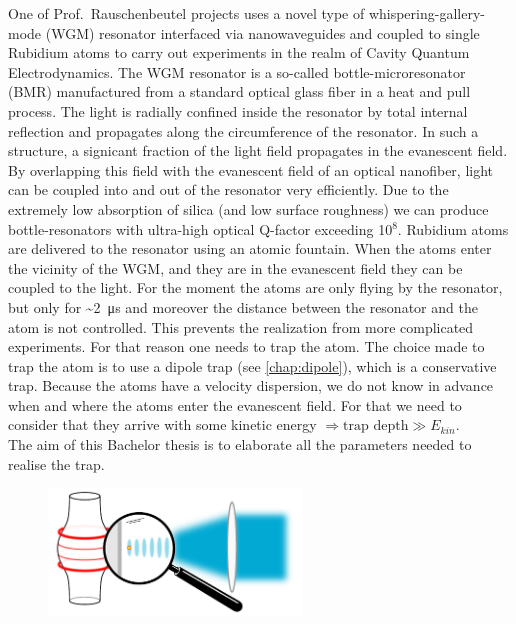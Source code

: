One of Prof.\ Rauschenbeutel projects uses a novel type of whispering-gallery-mode (WGM)
resonator interfaced via nanowaveguides and coupled to single Rubidium atoms to carry out
experiments in the realm of Cavity Quantum Electrodynamics. The WGM resonator
is a so-called bottle-microresonator (BMR) manufactured from a standard optical glass
fiber in a heat and pull process. The light is radially confined inside the resonator by
total internal reflection and propagates along the circumference of the resonator. In such
a structure, a signicant fraction of the light field propagates in the evanescent field. By
overlapping this field with the evanescent field of an optical nanofiber, light can be coupled
into and out of the resonator very efficiently. Due to the extremely low absorption
of silica (and low surface roughness) we can produce bottle-resonators with ultra-high
optical Q-factor exceeding 10\(^{8}\). Rubidium atoms are delivered to the resonator using
an atomic fountain. When the atoms enter the vicinity of the WGM, and they are in the evanescent
field they can be coupled to the light. For the moment the atoms are only flying by the 
resonator, but only for \textasciitilde{}\SI{2}{\micro\second} and moreover the distance 
between the resonator and the atom is not controlled. This prevents the realization from 
more complicated experiments. For that reason one needs to trap the atom.
The choice made to trap the atom is to use a dipole trap (see \autoref{chap:dipole}), which
is a conservative trap. Because the atoms have a velocity dispersion, we do not know in
advance when and where the atoms enter the evanescent field. For that we need to consider that
they arrive with some kinetic energy \(\Rightarrow \text{trap depth} \gg E_{kin} \).\\
The aim of this Bachelor thesis is to elaborate all the parameters needed to realise the trap.
\vspace{\fill}
\begin{figure}[hb]
    \centering
    \includegraphics[width=0.6\textwidth]{resonator_trap}
\end{figure}